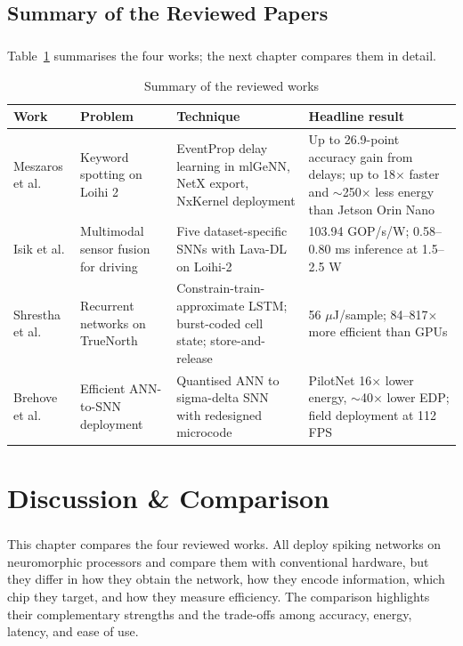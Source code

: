 \documentclass[12pt,a4paper,final]{extreport}
\begin{document}
\section{Summary of the Reviewed Papers}

\paragraph{} Table~\ref{tab:summary} summarises the four works; the next chapter compares them in detail.

{\renewcommand{\arraystretch}{1.15}
\begin{table}[htbp]
\centering
\caption{Summary of the reviewed works}\label{tab:summary}
\small
\begin{tabularx}{\textwidth}{|p{2.2cm}|p{2.5cm}|X|X|}
\hline
\textbf{Work} & \textbf{Problem} & \textbf{Technique} & \textbf{Headline result} \\ \hline
Meszaros et al. \cite{p1} & Keyword spotting on Loihi 2 & EventProp delay learning in mlGeNN, NetX export, NxKernel deployment & Up to 26.9-point accuracy gain from delays; up to 18$\times$ faster and $\sim$250$\times$ less energy than Jetson Orin Nano \\ \hline
Isik et al. \cite{p2} & Multimodal sensor fusion for driving & Five dataset-specific SNNs with Lava-DL on Loihi-2 & 103.94 GOP/s/W; 0.58--0.80 ms inference at 1.5--2.5 W \\ \hline
Shrestha et al. \cite{p3} & Recurrent networks on TrueNorth & Constrain-train-approximate LSTM; burst-coded cell state; store-and-release & 56 $\mu$J/sample; 84--817$\times$ more efficient than GPUs \\ \hline
Brehove et al. \cite{p4} & Efficient ANN-to-SNN deployment & Quantised ANN to sigma-delta SNN with redesigned microcode & PilotNet 16$\times$ lower energy, $\sim$40$\times$ lower EDP; field deployment at 112 FPS \\ \hline
\end{tabularx}
\end{table}}

\chapter{Discussion \& Comparison}

\paragraph{} This chapter compares the four reviewed works. All deploy spiking networks on neuromorphic processors and compare them with conventional hardware, but they differ in how they obtain the network, how they encode information, which chip they target, and how they measure efficiency. The comparison highlights their complementary strengths and the trade-offs among accuracy, energy, latency, and ease of use.
\end{document}
